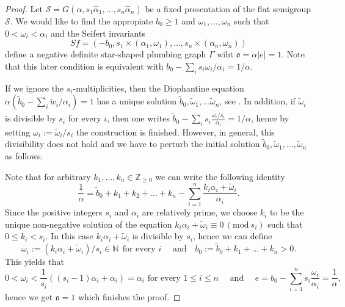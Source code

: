 \documentclass[oneside]{amsart}
\numberwithin{equation}{section}
\numberwithin{equation}{subsection}
\theoremstyle{plain}
\theoremstyle{definition}
\newcommand{\calS}{{\mathcal S}}\newcommand{\cals}{{\bf s}}\newcommand{\calst}{{\bf st}}\newcommand{\cS}{{\mathcal S}}
\newcommand{\w}{\omega}
\newcommand{\al}{\alpha}
\newcommand{\oo}{\mathfrak{o}}
\newcommand{\z}[1]{\widehat{#1}}
\begin{document}
\begin{proof}
Let $\calS=G(\al,s_1\z{\al}_1,\dots,s_n\z{\al}_n)$ be a fixed presentation of the flat semigroup $\calS$. We would like to find the appropiate $b_0\geq 1$ and $\w_1,\dots,\w_n$ such that $0<\omega_i<\al_i$ and  the Seifert invariants 
\begin{equation}\label{eq:Sfcr}
Sf=(-b_0,s_1\times(\al_1,\w_1),\dots,s_n\times(\al_n,\w_n))
\end{equation}     
define a negative definite star-shaped plumbing graph $\Gamma$ wiht $\oo=\al|e|=1$.  Note that this later condition is equivalent with $b_0-\sum_i s_i \w_i/ \al_i= 1/\al$.   

If we ignore the $s_i$-multiplicities, then the Diophantine equation $\al(\widetilde{b}_0-\sum_i \widetilde{w}_i/\al_i)=1$ has a unique solution $\widetilde{b}_0,\widetilde{\w}_1,\dots \widetilde{\w}_n$, see \cite{stronglyflat}.
 In addition, if $\widetilde{\w}_i$ is divisible by $s_i$ for every $i$,
 then one writes $\widetilde{b}_0-\sum_i s_i \frac{\widetilde{\w}_i/s_i}{\al_i}=1/\al$, hence by setting $\w_i:=\widetilde{\w}_i/s_i$  the construction
 is finished. However, in general, this divisibility does not hold and 
 we have to perturb the initial solution $\widetilde{b}_0,\widetilde{\w}_1,\dots,\widetilde{\w}_n$ as follows.
 
 Note that for arbitrary $k_1,\dots,k_n\in \mathbb{Z}_{\geq 0}$ we can write the 
 following identity
 \[
    \frac{1}{\al}=\widetilde{b}_0+k_1+k_2+\dots+k_n-\sum_{i=1}^n \frac{k_i \al_i+\widetilde{\w}_i}{\al_i}.
 \]
Since the positive integers $s_i$ and $\al_i$ are relatively prime,
 we choose $k_i$ to be the unique  
non-negative solution of  the equation $k_i \al_i+\widetilde{\w}_i\equiv 0\, (\mathrm{mod } \ s_i)$ such that $0\leq k_i<s_i$.
 In this case $k_i \al_i+\widetilde{\w}_i$ is divisible by $s_i$, hence we can define  
 \[
    \w_i:=(k_i \al_i+\widetilde{\w}_i)/s_i\in\mathbb{N}\ \ \mbox{for every } i\quad
    \mbox{ and}\quad 
    b_0:=\widetilde{b}_0+k_1+\dots+k_n >0. 
 \] This yields that
 \[
 0<\w_i<\frac{1}{s_i}\left((s_i-1)\al_i+\al_i\right)=\al_i\mbox{ for every } 1\le i\le n \quad\text{ and }\quad     e=b_0-\sum_{i=1}^n s_i \frac{\w_i}{\al_i}=\frac{1}{\al},
 \] hence we get $\oo=1$ which finishes the proof.



\end{proof}
\end{document}

